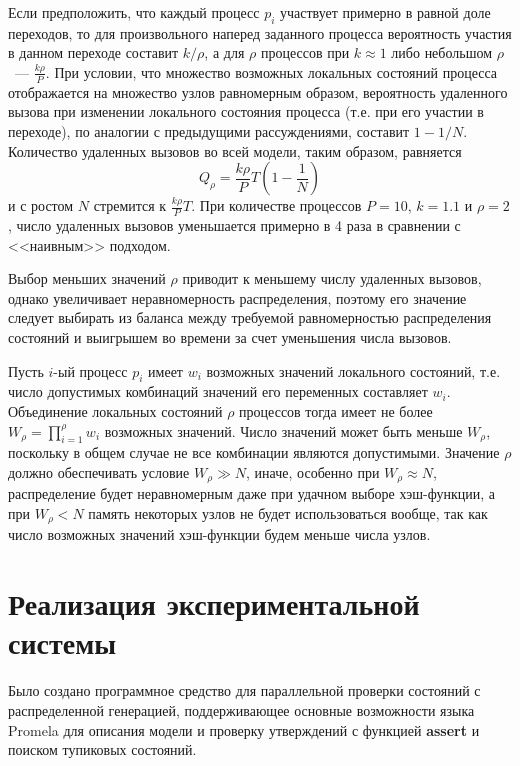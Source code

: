 \documentclass[12pt,a4paper,fleqn]{article}
\begin{document}
Если предположить, что каждый процесс $p_i$ участвует примерно в равной доле переходов, то для произвольного наперед заданного процесса вероятность участия в данном переходе составит $k/\rho$, а для $\rho$ процессов при $k \approx 1$ либо небольшом $\rho$~--- $\frac{k \rho}{P}$.
При условии, что множество возможных локальных состояний процесса отображается на множество узлов равномерным образом, вероятность удаленного вызова при изменении локального состояния процесса (т.е. при его участии в переходе), по аналогии с предыдущими рассуждениями, составит $1 - 1/N$. Количество удаленных вызовов во всей модели, таким образом, равняется
\begin{equation}
  \label{eq:rpc-partproc}
  Q_\rho = \frac{k \rho}{P} T (1 - \frac{1}{N})
\end{equation}
и с ростом $N$ стремится к $\frac{k \rho}{P} T$. При количестве процессов $P = 10$, $k = 1.1$ и $\rho = 2$, число удаленных вызовов уменьшается примерно в 4 раза в сравнении с <<наивным>> подходом.

Выбор меньших значений $\rho$ приводит к меньшему числу удаленных вызовов, однако увеличивает неравномерность распределения, поэтому его значение следует выбирать из баланса между требуемой равномерностью распределения состояний и выигрышем во времени за счет уменьшения числа вызовов.

Пусть $i$-ый процесс $p_i$ имеет $w_i$ возможных значений локального состояний, т.е. число допустимых комбинаций значений его переменных составляет $w_i$.
Объединение локальных состояний $\rho$ процессов тогда имеет не более $W_\rho = \prod_{i=1}^{\rho}{w_i}$ возможных значений.
Число значений может быть меньше $W_\rho$, поскольку в общем случае не все комбинации являются допустимыми.
Значение $\rho$ должно обеспечивать условие $W_\rho \gg N$, иначе, особенно при $W_\rho \approx N$, распределение будет неравномерным даже при удачном выборе хэш-функции, а при $W_\rho < N$ память некоторых узлов не будет использоваться вообще, так как число возможных значений хэш-функции будем меньше числа узлов.

\section{Реализация экспериментальной системы}
\label{sec:experim}

Было создано программное средство для параллельной проверки состояний с распределенной генерацией, поддерживающее основные возможности языка Promela для описания модели и проверку утверждений с функцией \textbf{assert} и поиском тупиковых состояний.
\end{document}
